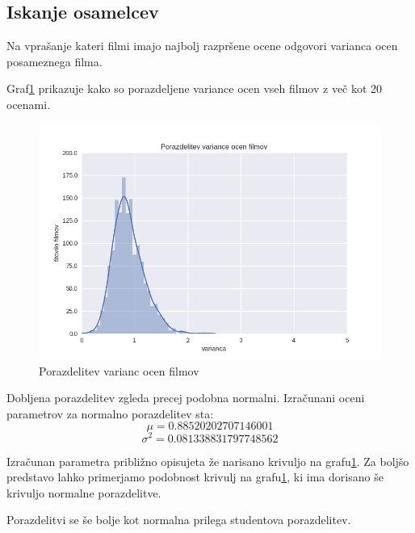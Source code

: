 \documentclass[a4paper,11pt]{article}
\begin{document}
\subsection{Iskanje osamelcev}
Na vprašanje kateri filmi imajo najbolj razpršene ocene odgovori varianca ocen posameznega filma. 

Graf\ref{slika2} prikazuje kako so porazdeljene variance ocen vseh filmov z več kot 20 ocenami.

\begin{figure}[htbp]
\begin{center}
\includegraphics[scale=0.7]{porazdelitev.png}
\caption{Porazdelitev varianc ocen filmov}
\label{slika2}
\end{center}
\end{figure}

Dobljena porazdelitev zgleda precej podobna normalni. Izračunani oceni parametrov za normalno porazdelitev sta:  
\[ \mu = 0.88520202707146001 \]  
\[ \sigma^2 = 0.081338831797748562 \]  

Izračunan parametra približno opisujeta že narisano krivuljo na grafu\ref{slika2}. Za boljšo predstavo lahko
primerjamo podobnost krivulj na grafu\ref{slika2}, ki ima dorisano še krivuljo normalne porazdelitve.

Porazdelitvi se še bolje kot normalna prilega studentova porazdelitev. 
\end{document}
